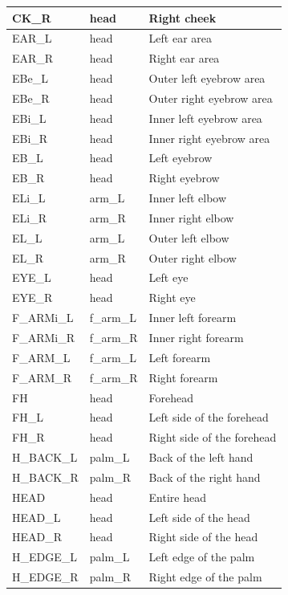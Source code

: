 \documentclass[../main.tex]{subfiles}
\begin{document}
\begin{longtable}{|p{2cm}|p{3cm}|p{5cm}|}
    CK\_R & head & Right cheek \\ \hline
    EAR\_L & head & Left ear area \\ \hline
    EAR\_R & head & Right ear area \\ \hline
    EBe\_L & head & Outer left eyebrow area \\ \hline
    EBe\_R & head & Outer right eyebrow area \\ \hline
    EBi\_L & head & Inner left eyebrow area \\ \hline
    EBi\_R & head & Inner right eyebrow area \\ \hline
    EB\_L & head & Left eyebrow \\ \hline
    EB\_R & head & Right eyebrow \\ \hline
    ELi\_L & arm\_L & Inner left elbow \\ \hline
    ELi\_R & arm\_R & Inner right elbow \\ \hline
    EL\_L & arm\_L & Outer left elbow \\ \hline
    EL\_R & arm\_R & Outer right elbow \\ \hline
    EYE\_L & head & Left eye \\ \hline
    EYE\_R & head & Right eye \\ \hline
    F\_ARMi\_L & f\_arm\_L & Inner left forearm \\ \hline
    F\_ARMi\_R & f\_arm\_R & Inner right forearm \\ \hline
    F\_ARM\_L & f\_arm\_L & Left forearm \\ \hline
    F\_ARM\_R & f\_arm\_R & Right forearm \\ \hline
    FH & head & Forehead \\ \hline
    FH\_L & head & Left side of the forehead \\ \hline
    FH\_R & head & Right side of the forehead \\ \hline
    H\_BACK\_L & palm\_L & Back of the left hand \\ \hline
    H\_BACK\_R & palm\_R & Back of the right hand \\ \hline
    HEAD & head & Entire head \\ \hline
    HEAD\_L & head & Left side of the head \\ \hline
    HEAD\_R & head & Right side of the head \\ \hline
    H\_EDGE\_L & palm\_L & Left edge of the palm \\ \hline
    H\_EDGE\_R & palm\_R & Right edge of the palm \\ \hline

\end{longtable}
\end{document}
